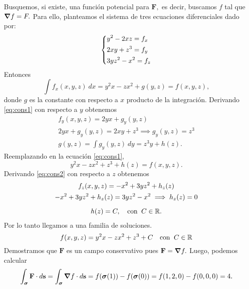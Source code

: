 
\begin{solution}
Busquemos, si existe,  una funci\'on potencial para $\mathbf{F},$ es decir, buscamos $f$ tal que $\grad f = F.$ Para ello,  planteamos el sistema de tres ecuaciones diferenciales dado por:
\[\begin{dcases}
        y^2-2xz=f_x \\
        2xy+z^3=f_y \\
        3yz^2-x^2=f_z
    \end{dcases}\]
Entonces
\begin{equation}
    \int f_x(x,y,z)\:dx=y^2x-zx^2+g(y,z)=f(x,y,z), \label{eq:cons1}
\end{equation}
donde $g$ es la constante con respecto a $x$ producto de la integraci\'on. Derivando \eqref{eq:cons1} con respecto a $y$ obtenemos
\begin{gather*}
    f_y(x,y,z)= 2yx+g_y(y,z)\\[.2cm]
    2yx+g_y(y,z)  = 2xy+z^3 \implies g_y(y,z)=z^3\\[.2cm]
    g(y,z)=\int  g_y(y,z) \:dy =  z^3y+h(z).
\end{gather*}
Reemplazando en  la ecuaci\'on \eqref{eq:cons1},
\begin{equation}
y^2x-zx^2+z^3+h(z) =  f(x,y,z).   \label{eq:cons2}
\end{equation}
Derivando \eqref{eq:cons2} con respecto a $z$ obtenemos
\begin{gather*}
    f_z(x,y,z)=-x^2+3yz^2+h_z(z)\\
    -x^2+3yz^2+h_z(z)=3yz^2-x^2   \implies h_z(z) =0 \\[.2cm]
    h(z) = C,\quad\text{con}\;\;C\in\mathbb{R}.
\end{gather*}
Por lo tanto llegamos a una familia de soluciones.
\[
    f(x,y,z)=y^2x-zx^2+z^3+C  \quad\text{con}\;\;C\in\mathbb{R}
\]
Demostramos que $\mathbf{F}$ es un campo conservativo pues $\mathbf{F}=\grad f.$ Luego, podemos calcular
\[
    \int _{\boldsymbol{\sigma}} \mathbf{F}\cdot d\mathbf{s}=
    \int _{\boldsymbol{\sigma}} \grad f\cdot d\mathbf{s} = f(\boldsymbol{\sigma}(1))-f(\boldsymbol{\sigma}(0))=f(1,2,0)-f(0,0,0)=4.
\]
\end{solution}


